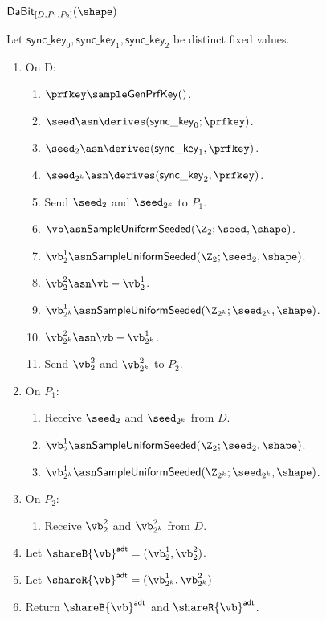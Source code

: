 
\msubsubsection
  {$\mathsf{DaBit}_{[D, P_1, P_2]}(\shape)$}

  Let $\mathsf{sync\_key}_0, \mathsf{sync\_key}_1, \mathsf{sync\_key}_2$ be distinct fixed values.

  \begin{enumerate}
  \item On D:
  \begin{enumerate}
    \item $\prfkey \sample \mathsf{GenPrfKey}()$.
    \item $\seed \asn \derives(\mathsf{sync\_key}_0; \prfkey)$.
    \item $\seed_2 \asn \derives(\mathsf{sync\_key}_1, \prfkey)$.
    \item $\seed_{2^k} \asn \derives(\mathsf{sync\_key}_2, \prfkey)$.
    \item Send $\seed_2$ and $\seed_{2^k}$ to $P_1$.

    \item $\vb \asn \mathsf{SampleUniformSeeded}(\Z_2; \seed, \shape)$.
    \item $\vb^1_{2} \asn \mathsf{SampleUniformSeeded}(\Z_2; \seed_2, \shape)$.
    \item $\vb^2_{2} \asn \vb - \vb^1_{2}$.
    \item $\vb^1_{2^k} \asn \mathsf{SampleUniformSeeded}(\Z_{2^k}; \seed_{2^k}, \shape)$.
    \item $\vb^2_{2^k} \asn \vb - \vb^1_{2^k}$.
    \item Send $\vb^2_2$ and $\vb^2_{2^k}$ to $P_2$.
  \end{enumerate}

  \item On $P_1$:
 \begin{enumerate}
     \item Receive $\seed_2$ and $\seed_{2^k}$ from $D$.
     \item $\vb^1_{2} \asn \mathsf{SampleUniformSeeded}(\Z_2; \seed_2, \shape)$.
     \item $\vb^1_{2^k} \asn \mathsf{SampleUniformSeeded}(\Z_{2^k}; \seed_{2^k}, \shape)$.
 \end{enumerate}
\item On $P_2$:
\begin{enumerate}
    \item Receive $\vb^2_2$ and $\vb^2_{2^k}$ from $D$.
\end{enumerate}
\item Let $\shareB{\vb}^\mathsf{adt} = (\vb^1_2, \vb^2_2)$.
\item Let $\shareR{\vb}^\mathsf{adt} = (\vb^1_{2^k}, \vb^2_{2^k})$
\item Return $\shareB{\vb}^\mathsf{adt}$ and $\shareR{\vb}^\mathsf{adt}$.
\end{enumerate}

